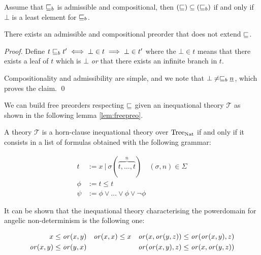 \begin{alemma}
    \label{lem:coarserpreorder}
    Assume that $\sqsubseteq_b$ is admissible and compositional,
    then $(\sqsubseteq) \subseteq (\sqsubseteq_b)$ if and only if
    $\bot$ is a least element for $\sqsubseteq_b$.
\end{alemma}

    
\begin{example}
    There exists an admissible and compositional 
    preorder that does not extend $\sqsubseteq$.
\end{example}

\begin{proof}
    Define $t \sqsubseteq_b t' \iff \bot \in t \implies \bot \in t'$ where
    the $\bot \in t$ means that there exists a leaf of $t$ 
    which is $\bot$ \emph{or} that there exists an infinite branch 
    in $t$.

    Compositionality and admissibility are simple, and we note 
    that $\bot \neq \sqsubseteq_b \underline{n}$, which proves 
    the claim.
\qed\end{proof}


We can build free preorders respecting $\sqsubseteq$
given an inequational theory $\mathcal{T}$ as shown
in the following lemma \ref{lem:freepreo}.

\begin{adefinition}
    A theory $\mathcal{T}$ is a horn-clause inequational 
    theory over $\textnormal{Tree}_{\textnormal{Nat}}$ if and only if it consists 
    in a list of formulas obtained with the following grammar:

    \begin{align*}
        t    &:= x ~|~ \sigma (\overbrace{t,\dots,t}^n) \quad (\sigma,n) \in
        \Sigma\\
        \phi &:= t \leq t \\
        \psi &:= \phi \vee \dots \vee \phi \vee \neg \phi
    \end{align*}
\end{adefinition}

\begin{example}
    It can be shown that the inequational theory 
    characterising the powerdomain for angelic 
    non-determinism is the following one:

    \begin{align*}
        x \leq \operatorname{\mathit{or}} (x,y) & & \operatorname{\mathit{or}} (x,x) \leq x & & \operatorname{\mathit{or}} (x,\operatorname{\mathit{or}} (y,z))
        \leq \operatorname{\mathit{or}}(\operatorname{\mathit{or}} (x,y),z) \\
        \operatorname{\mathit{or}} (x,y) \leq \operatorname{\mathit{or}}(y,x) & & & & \operatorname{\mathit{or}}(\operatorname{\mathit{or}} (x,y),z) \leq \operatorname{\mathit{or}}
        (x,\operatorname{\mathit{or}} (y,z))
    \end{align*}
\end{example}

